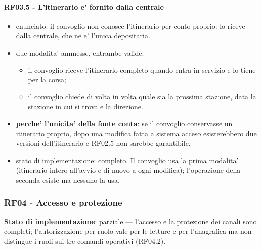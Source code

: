 \documentclass[11pt]{article}
\begin{document}
\paragraph{RF03.5 - L'itinerario e' fornito dalla centrale}
\label{sec:org55fd15c}
\begin{itemize}
\item enunciato: il convoglio non conosce l'itinerario per conto proprio: lo riceve dalla centrale, che
ne e' l'unica depositaria.
\item due modalita' ammesse, entrambe valide:
\begin{itemize}
\item il convoglio riceve l'itinerario completo quando entra in servizio e lo tiene per la corsa;
\item il convoglio chiede di volta in volta quale sia la prossima stazione, data la stazione in cui si
trova e la direzione.
\end{itemize}
\item \textbf{perche' l'unicita' della fonte conta}: se il convoglio conservasse un itinerario proprio, dopo una
modifica fatta a sistema acceso esisterebbero due versioni dell'itinerario e RF02.5 non sarebbe
garantibile.
\item stato di implementazione: completo. Il convoglio usa la prima modalita' (itinerario intero
all'avvio e di nuovo a ogni modifica); l'operazione della seconda esiste ma nessuno la usa.
\end{itemize}
\subsubsection{RF04 - Accesso e protezione}
\label{sec:org4c74804}

\textbf{Stato di implementazione}: parziale — l'accesso e la protezione dei canali sono completi;
l'autorizzazione per ruolo vale per le letture e per l'anagrafica ma non distingue i ruoli sui tre
comandi operativi (RF04.2).
\end{document}
